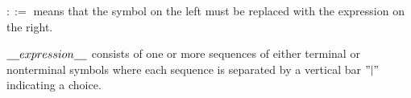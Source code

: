 \documentclass[a4paper,10pt]{article}
\begin{document}
\begin{terms}
\begin{terms}
        \item $::=$ means that the symbol on the left must be replaced with the expression on the right.

        \item $\underline{\hspace{4mm}}{}expression\underline{\hspace{4mm}}$  consists of one or more sequences of either terminal or nonterminal symbols where each sequence is separated by a vertical bar $"|"$ indicating a choice.
    \end{terms}
\end{terms}
\end{document}
